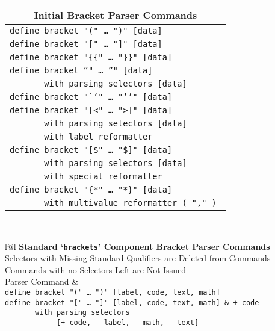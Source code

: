 \documentclass[12pt]{article}
\makeatletter
\newcommand{\TT}[1]{{\tt \bfseries #1}}
\newcommand{\ttkey}[1]{\TT{#1}\index{#1@\TT{#1}}}
\makeatother
\begin{document}
\begin{center}\label{UNTYPED-BRACKET-BUILTINS}
\begin{tabular}{l}
\multicolumn{1}{c}{\bf Initial Bracket Parser Commands}
\\\hline
\tt define bracket "(" \ldots~")" [data] \\
\tt define bracket "[" \ldots~"]" [data] \\
\tt define bracket "\{\{" \ldots~"\}\}" [data] \\
\tt define bracket "`" \ldots~"'" [data] \\
\tt ~~~~~~~with parsing selectors [data] \\
\tt define bracket "``" \ldots~"''" [data] \\
\tt define bracket "[<" \ldots~">]" [data] \\
\tt ~~~~~~~with parsing selectors [data] \\
\tt ~~~~~~~with label reformatter \\
\tt define bracket "[\$" \ldots~"\$]" [data] \\
\tt ~~~~~~~with parsing selectors [data] \\
\tt ~~~~~~~with special reformatter \\
\tt define bracket "\{*" \ldots~"*\}" [data] \\
\tt ~~~~~~~with multivalue reformatter ( "," ) \\
\end{tabular}
\\[2ex]
\begin{tabular}{l@{\hspace*{0.2in}}l}
{\bf Standard `\ttkey{brackets}'\label{STANDARD-BRACKETS-1} Component
     Bracket Parser Commands}
\\[1ex]
{Selectors with Missing Standard Qualifiers are Deleted from Commands} \\
{Commands with no Selectors Left are Not Issued}
\\[1ex]
Parser Command				& 
\\\hline
\tt define bracket "(" \ldots~")" [label, code, text, math] \\
\tt define bracket "[" \ldots~"]" [label, code, text, math]
						              & \tt + code \\
\tt ~~~~~~~with parsing selectors \\
\tt ~~~~~~~~~~~~[+ code, - label, - math, - text] \\

\end{tabular}
\end{center}
\end{document}
